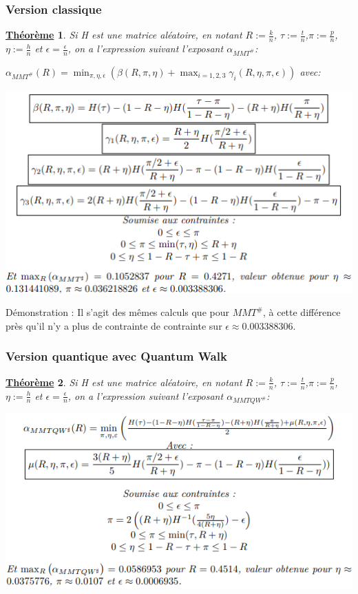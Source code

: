 \documentclass[12pt,openany]{report}
\newtheorem{theorem}{\underline{Théorème}}
\begin{document}
\subsubsection{Version classique}
\begin{theorem} \cite{Ghazal}
Si H est une matrice aléatoire, en notant $R:=\frac{k}{n}  $, $\tau :=\frac{t}{n}$,$\pi:=\frac{p}{n} $,$\eta :=\frac{h}{n}$ et $ \epsilon=\frac{\epsilon}{n}$, on a l'expression suivant l'exposant $\alpha_{MMT^{\#}} $:

$\alpha_{MMT^{\#}} (R)=\min_{\pi,\eta,\epsilon}(\beta(R,\pi,\eta)+ \max_{i=1,2,3}\gamma_i(R,\eta,\pi,\epsilon))$ avec:
\begin{center}
\includegraphics[scale=1.2]{./mmt_diese}
\end{center}


\end{theorem}


Démonstration : Il s'agit des mêmes calculs que pour $ MMT^{\#}  $, à cette différence près qu'il n'y a plus de contrainte de contrainte sur $\epsilon \approx 0.003388306  $.
\subsubsection{Version quantique avec Quantum Walk}
\begin{theorem}\cite{Ghazal} Si H est une matrice aléatoire, en notant  $R:=\frac{k}{n}  $, $\tau :=\frac{t}{n}$,$\pi:=\frac{p}{n} $,$\eta :=\frac{h}{n}$ et $ \epsilon=\frac{\epsilon}{n}$, on a l'expression suivant l'exposant $\alpha_{MMTQW^{\#}} $:
\begin{center}
\includegraphics[scale=1.2]{./qw_diese}
\end{center}
\end{theorem}
\end{document}
